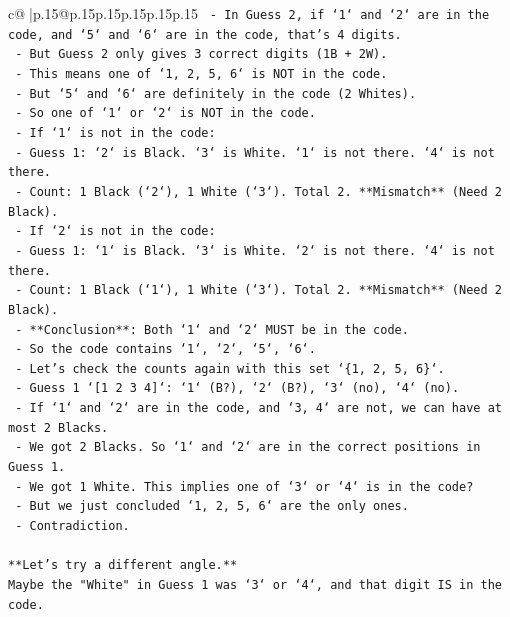 \documentclass{article}
\begin{document}
{\begin{supertabular}{c@{$\;$}|p{.15\linewidth}@{}p{.15\linewidth}p{.15\linewidth}p{.15\linewidth}p{.15\linewidth}p{.15\linewidth}}
{{{\texttt{    {-}   In Guess 2, if `1` and `2` are in the code, and `5` and `6` are in the code, that's 4 digits.} \\
\texttt{    {-}   But Guess 2 only gives 3 correct digits (1B + 2W).} \\
\texttt{    {-}   This means one of `1, 2, 5, 6` is NOT in the code.} \\
\texttt{    {-}   But `5` and `6` are definitely in the code (2 Whites).} \\
\texttt{    {-}   So one of `1` or `2` is NOT in the code.} \\
\texttt{    {-}   If `1` is not in the code:} \\
\texttt{        {-}   Guess 1: `2` is Black. `3` is White. `1` is not there. `4` is not there.} \\
\texttt{        {-}   Count: 1 Black (`2`), 1 White (`3`). Total 2. **Mismatch** (Need 2 Black).} \\
\texttt{    {-}   If `2` is not in the code:} \\
\texttt{        {-}   Guess 1: `1` is Black. `3` is White. `2` is not there. `4` is not there.} \\
\texttt{        {-}   Count: 1 Black (`1`), 1 White (`3`). Total 2. **Mismatch** (Need 2 Black).} \\
\texttt{    {-}   **Conclusion**: Both `1` and `2` MUST be in the code.} \\
\texttt{    {-}   So the code contains `1`, `2`, `5`, `6`.} \\
\texttt{    {-}   Let's check the counts again with this set `\{1, 2, 5, 6\}`.} \\
\texttt{    {-}   Guess 1 `{[}1 2 3 4{]}`: `1` (B?), `2` (B?), `3` (no), `4` (no).} \\
\texttt{        {-}   If `1` and `2` are in the code, and `3, 4` are not, we can have at most 2 Blacks.} \\
\texttt{        {-}   We got 2 Blacks. So `1` and `2` are in the correct positions in Guess 1.} \\
\texttt{        {-}   We got 1 White. This implies one of `3` or `4` is in the code?} \\
\texttt{        {-}   But we just concluded `1, 2, 5, 6` are the only ones.} \\
\texttt{        {-}   Contradiction.} \\
\\ 
\texttt{**Let's try a different angle.**} \\
\texttt{Maybe the "White" in Guess 1 was `3` or `4`, and that digit IS in the code.} \\
}}}
\end{supertabular}}
\end{document}
